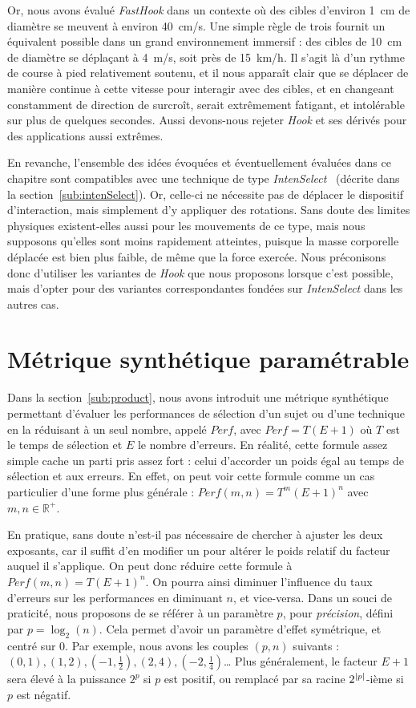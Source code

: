 	Or, nous avons évalué \emph{FastHook} dans un contexte où des cibles d'environ 1~cm de diamètre se meuvent à environ 40~cm/s. Une simple règle de trois fournit un équivalent possible dans un grand environnement immersif : des cibles de 10~cm de diamètre se déplaçant à 4~m/s, soit près de 15~km/h. Il s'agit là d'un rythme de course à pied relativement soutenu, et il nous apparaît clair que se déplacer de manière continue à cette vitesse pour interagir avec des cibles, et en changeant constamment de direction de surcroît, serait extrêmement fatigant, et intolérable sur plus de quelques secondes. Aussi devons-nous rejeter \emph{Hook} et ses dérivés pour des applications aussi extrêmes.
	
	En revanche, l'ensemble des idées évoquées et éventuellement évaluées dans ce chapitre sont compatibles avec une technique de type \emph{IntenSelect}~\cite{de2005intenselect} (décrite dans la section~\ref{sub:intenSelect}). Or, celle-ci ne nécessite pas de déplacer le dispositif d'interaction, mais simplement d'y appliquer des rotations. Sans doute des limites physiques existent-elles aussi pour les mouvements de ce type, mais nous supposons qu'elles sont moins rapidement atteintes, puisque la masse corporelle déplacée est bien plus faible, de même que la force exercée. Nous préconisons donc d'utiliser les variantes de \emph{Hook} que nous proposons lorsque c'est possible, mais d'opter pour des variantes correspondantes fondées sur \emph{IntenSelect} dans les autres cas.
	
	\section{Métrique synthétique paramétrable}
	Dans la section~\ref{sub:product}, nous avons introduit une métrique synthétique permettant d'évaluer les performances de sélection d'un sujet ou d'une technique en la réduisant à un seul nombre, appelé $Perf$, avec $Perf = T(E+1)$ où $T$ est le temps de sélection et $E$ le nombre d'erreurs. En réalité, cette formule assez simple cache un parti pris assez fort : celui d'accorder un poids égal au temps de sélection et aux erreurs. En effet, on peut voir cette formule comme un cas particulier d'une forme plus générale : $Perf(m,n) = T^{m}(E+1)^{n}$ avec $m, n \in \mathbb{R}^{+}$.
	
	En pratique, sans doute n'est-il pas nécessaire de chercher à ajuster les deux exposants, car il suffit d'en modifier un pour altérer le poids relatif du facteur auquel il s'applique. On peut donc réduire cette formule à $Perf(m,n) = T(E+1)^{n}$. On pourra ainsi diminuer l'influence du taux d'erreurs sur les performances en diminuant $n$, et vice-versa. Dans un souci de praticité, nous proposons de se référer à un paramètre $p$, pour \emph{précision}, défini par $p = \log_2\left(n\right)$. Cela permet d'avoir un paramètre d'effet symétrique, et centré sur 0. Par exemple, nous avons les couples $(p,n)$ suivants : $\left(0,1\right), \left(1,2\right), \left(-1,\frac{1}{2}\right), \left(2,4\right), \left(-2,\frac{1}{4}\right)$\ldots{} Plus généralement, le facteur $E+1$ sera élevé à la puissance $2^{p}$ si $p$ est positif, ou remplacé par sa racine $2^{\abs*{p}}$-ième si $p$ est négatif.
	
